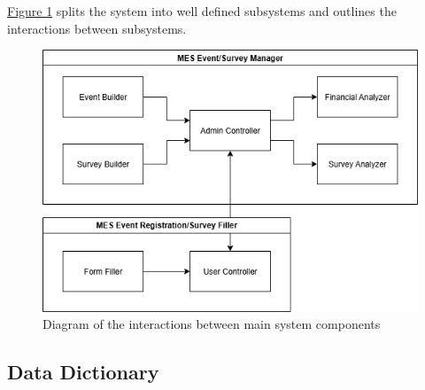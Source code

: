 \documentclass[12pt]{article}
\begin{document}
\hyperref[fig:businessdata]{Figure \ref{fig:businessdata}} splits the system into well defined subsystems and outlines the interactions between subsystems.

\begin{center}
\begin{figure}[H]
    \centering
    \includegraphics[width=1\linewidth]{images/business_data_model.png}
    \caption{Diagram of the interactions between main system components}\label{fig:businessdata}
\end{figure}
\end{center}
\subsection{Data Dictionary}
\end{document}
